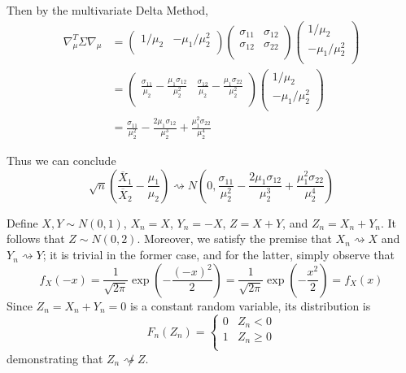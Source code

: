 \documentclass[a4paper]{article}
\begin{document}
Then by the multivariate Delta Method,
\begin{align*}
	\nabla^{T}_{\mu } \Sigma \nabla_{\mu } & = 
	\begin{pmatrix}
		1 / \mu_{2} & - \mu_{1} / \mu^{2}_{2} \\
	\end{pmatrix}
	\begin{pmatrix}
		\sigma_{11} & \sigma_{12} \\
		\sigma_{12} & \sigma_{22} \\
	\end{pmatrix}
	\begin{pmatrix}
		1 / \mu_{2} \\
		- \mu_{1} / \mu^{2}_{2} \\
	\end{pmatrix} \\
	& =
	\begin{pmatrix}
		\frac{\sigma_{11}}{\mu_{2}} - \frac{\mu_{1} \sigma_{12}}{\mu^{2}_{2}} & \frac{\sigma_{12}}{\mu_{2}} - \frac{\mu_{1} \sigma_{22}}{\mu^{2}_{2}} \\
	\end{pmatrix}
	\begin{pmatrix}
		1 / \mu_{2} \\
		-\mu_{1} / \mu^{2}_{2} \\
	\end{pmatrix} \\
	& = \frac{\sigma_{11}}{\mu^{2}_{2}} - \frac{2 \mu_{1} \sigma_{12}}{\mu^{3}_{2}} + \frac{\mu^{2}_{1} \sigma_{22}}{\mu^{4}_{2}}
\end{align*}

Thus we can conclude
\[
	\sqrt{n} \left( \frac{\overline{X}_{1}}{\overline{X}_{2}} - \frac{\mu_{1}}{\mu_{2}} \right) \rightsquigarrow N \left( 0, \frac{\sigma_{11}}{\mu^{2}_{2}} - \frac{2 \mu_{1} \sigma_{12}}{\mu^{3}_{2}} + \frac{\mu^{2}_{1} \sigma_{22}}{\mu^{4}_{2}} \right) 
\]


Define \(X, Y \sim N \left( 0,1 \right) \), \(X_{n} = X\), \(Y_{n} = -X\), \(Z = X + Y\), and \(Z_{n} = X_{n} + Y_{n}\). It follows that \(Z \sim N \left( 0,2 \right) \). Moreover, we satisfy the premise that \(X_{n} \rightsquigarrow X\) and \(Y_{n} \rightsquigarrow Y\); it is trivial in the former case, and for the latter, simply observe that 
\[
	f_{X}\left( -x \right) = \frac{1}{\sqrt{2 \pi }} \exp\left( -\frac{\left( -x \right)^{2}}{2} \right) = \frac{1}{\sqrt{2 \pi }} \exp\left( -\frac{x^{2}}{2} \right) = f_{X}\left( x \right)
\]
Since \(Z_{n} = X_{n} + Y_{n} = 0\) is a constant random variable, its distribution is
\[
	F_{n}\left( Z_{n} \right) = \begin{cases}
		0 & Z_{n} < 0  \\
		1 & Z_{n} \ge 0 \\
	\end{cases}
\]
demonstrating that \(Z_{n} \not\rightsquigarrow Z\).
\end{document}
